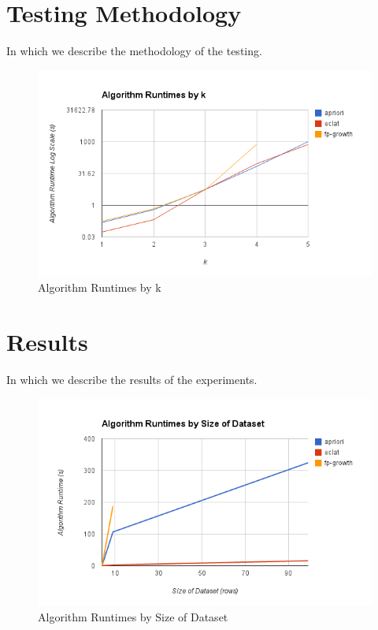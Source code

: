 \documentclass[11pt]{article}
\begin{document}
\begin{multicols}{2}
\section{Testing Methodology}

In which we describe the methodology of the testing.

\begin{center}
\begin{figure}
\includegraphics[scale=0.9]{../figs/runtimes_by_k.png}
\caption{Algorithm Runtimes by k}
\end{figure}
\end{center}

\section{Results}
\label{sec:results}

In which we describe the results of the experiments.

\begin{center}
\begin{figure}
\includegraphics[scale=0.9]{../figs/runtimes_by_rows.png}
\caption{Algorithm Runtimes by Size of Dataset}
\end{figure}
\end{center}


\end{multicols}
\end{document}
